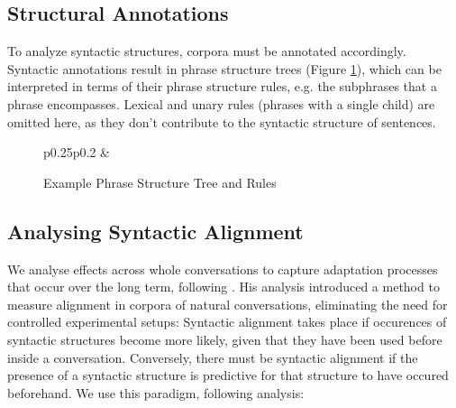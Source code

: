 \documentclass[11pt]{article}
\begin{document}
\subsection{Structural Annotations}
To analyze syntactic structures, corpora must be annotated accordingly. Syntactic annotations result in phrase structure trees (Figure \ref{fig:tree}), which can be interpreted in terms of their phrase structure rules, e.g. the subphrases that a phrase encompasses. Lexical and unary rules (phrases with a single child) are omitted here, as they don't contribute to the syntactic structure of sentences. 
\begin{figure}
  \begin{tabular}{p{}p{}}
    &
    \begin{center}
        
      \end{center}
      
    \end{tabular}
  \caption{Example Phrase Structure Tree and Rules}
  \label{fig:tree}
  
\end{figure}

\subsection{Analysing Syntactic Alignment}
We analyse effects across whole conversations to capture adaptation processes that occur over the long term, following \citealp{reitter2008context}. His analysis introduced a method to measure alignment in corpora of natural conversations, eliminating the need for controlled experimental setups: Syntactic alignment takes place if occurences of syntactic structures become more likely, given that they have been used before inside a conversation. Conversely, there must be syntactic alignment if the presence of a syntactic structure is predictive for that structure to have occured beforehand. We use this paradigm, following  analysis:
\end{document}
